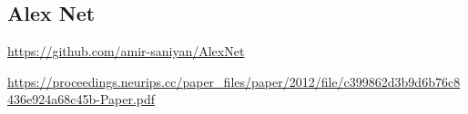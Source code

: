 \subsection{Alex Net}

\url{https://github.com/amir-saniyan/AlexNet}

\url{https://proceedings.neurips.cc/paper_files/paper/2012/file/c399862d3b9d6b76c8436e924a68c45b-Paper.pdf}
